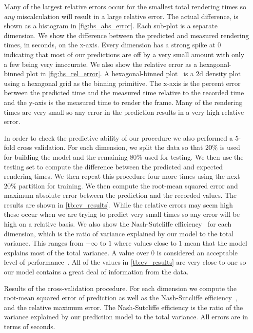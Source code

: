 Many of the largest relative errors occur for the smallest total rendering
times so \emph{any} miscalculation will result in a large relative error.  The
actual difference, is shown as a histogram in \autoref{fig:hs_abs_error}.  Each
sub-plot is a separate dimension.  We show the difference between the
predicted and measured rendering times, in seconds, on the x-axis.  Every
dimension has a strong spike at $0$ indicating that most of our predictions
are off by a very small amount with only a few being very inaccurate.  We also
show the relative error as a hexagonal-binned plot in \autoref{fig:hs_rel_error}.
A hexagonal-binned plot~\cite{Carr:1987} is a $2$d density plot using a
hexagonal grid as the binning primitive.  The x-axis is the percent error
between the predicted time and the measured time relative to the recorded time
and the y-axis is the measured time to render the frame.  Many of the
rendering times are very small so any error in the prediction results in a
very high relative error.

In order to check the predictive ability of our procedure we also performed a 
5-fold cross validation.  For each dimension, we split the data so that
$20\%$ is used for building the model and the remaining $80\%$ used for 
testing.  We then use the testing set to compute the difference between the 
predicted and expected rendering times.  We then repeat this procedure four
more times using the next $20\%$ partition for training.  We then compute
the root-mean squared error and maximum absolute
error between the prediction and the recorded values.  The results are 
shown in \autoref{tb:cv_results}.  While the relative errors may
seem high these occur when we are trying to predict very small
times so any error will be high on a relative basis.
We also show the
Nash-Sutcliffe efficiency~\cite{Nash:1970} for each dimension, which is the 
ratio of variance explained by our model to the total variance.  This ranges
from $-\infty$ to $1$ where values close to $1$ mean that the model explains 
most of the total variance.  A value over $0$ is considered an acceptable
level of performance~\cite{Moriasi:2007}.
All of the values in \autoref{tb:cv_results} are 
very close to one so our model contains a great deal of information from
the data.

\begin{table}[htb]
\centering
\caption{
  Results of the cross-validation procedure.  For each dimension we compute
  the root-mean squared error of prediction as well as the Nash-Sutcliffe
  efficiency~\cite{Nash:1970}, and the relative maximum error.  The 
  Nash-Sutcliffe
  efficiency is the ratio of the variance explained by our prediction
  model to the total variance.
  All errors are in terms of seconds.
  }

\label{tb:cv_results}
\end{table}


